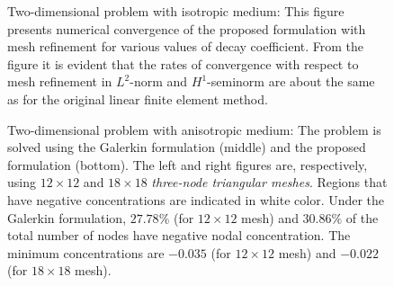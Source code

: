 \documentclass[11pt]{amsart}
\begin{document}
\begin{figure}[!h]
  \centering
\caption{Two-dimensional problem with isotropic medium: This figure presents numerical 
  convergence of the proposed formulation with mesh refinement for various values of decay 
  coefficient. From the figure it is evident that the rates of convergence with respect to mesh 
  refinement in $L^{2}$-norm and $H^{1}$-seminorm are about the same as for the original 
  linear finite element method.} \label{Fig:Decay_error_convergence_2D}
\end{figure}

\clearpage
\newpage

\begin{figure}
  \centering
\caption{Two-dimensional problem with anisotropic medium: The problem is solved using the 
    Galerkin formulation (middle) and the proposed formulation (bottom). The left and right 
    figures are, respectively, using $12 \times 12$ and $18 \times 18$ \emph{three-node 
      triangular meshes}. Regions that have negative concentrations are indicated in white 
    color. Under the Galerkin formulation, $27.78 \%$ (for $12 \times 12$ mesh) and $30.86\%$ 
    of the total number of nodes have negative nodal concentration. The minimum concentrations 
    are $-0.035$ (for $12 \times 12$ mesh) and $-0.022$ (for $18 \times 18$ mesh).}
  \label{Fig:Decay_2D_anisotropic_T3}
\end{figure}
\end{document}
